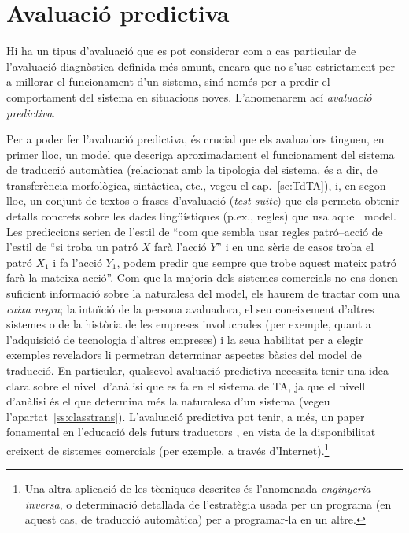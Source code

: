 \section{Avaluació predictiva}
\label{ss:avalpred}

Hi ha un tipus d'avaluació que es pot considerar com a cas particular
de l'avaluació diagnòstica definida més amunt, encara que no s'use
estrictament per a millorar el funcionament d'un sistema, sinó només
per a predir el comportament del sistema en situacions noves.
L'anomenarem ací \emph{avaluació predictiva}.

Per a poder fer l'avaluació predictiva, és crucial que els avaluadors
tinguen, en primer lloc, un model que descriga aproximadament el
funcionament del sistema de traducció automàtica (relacionat amb la
tipologia del sistema, és a dir, de transferència morfològica,
sintàctica, etc., vegeu el cap.~\ref{se:TdTA}), i, en segon lloc, un
conjunt de textos o frases d'avaluació (\emph{test suite}) que els
permeta obtenir detalls concrets sobre les dades lingüístiques (p.ex.,
regles) que usa aquell model.  Les prediccions serien de l'estil de
``com que sembla usar regles patró--acció de l'estil de ``si troba un
patró $X$ farà l'acció $Y$'' i en una sèrie de casos troba el patró
$X_1$ i fa l'acció $Y_1$, podem predir que sempre que trobe aquest
mateix patró farà la mateixa acció''. Com que la majoria dels sistemes
comercials no ens donen suficient informació sobre la naturalesa del
model, els haurem de tractar com una \emph{caixa negra}; la
intuïció de la persona avaluadora, el seu coneixement d'altres
sistemes o de la història de les empreses involucrades (per exemple,
quant a l'adquisició de tecnologia d'altres empreses) i la seua
habilitat per a elegir exemples reveladors li permetran determinar
aspectes bàsics del model de traducció. En particular, qualsevol
avaluació predictiva necessita tenir una idea clara sobre el nivell
d'anàlisi que es fa en el sistema de TA, ja que el nivell d'anàlisi és
el que determina més la naturalesa d'un sistema (vegeu
l'apartat~\ref{ss:classtrans}).  L'avaluació predictiva pot tenir, a
més, un paper fonamental en l'educació dels futurs traductors
\citep{mira98j,forcada00p}, en vista de la disponibilitat creixent de
sistemes comercials (per exemple, a través d'Internet).\footnote{Una
  altra aplicació de les tècniques descrites és l'anomenada
  \emph{enginyeria inversa}, o determinació detallada de l'estratègia
  usada per un programa (en aquest cas, de traducció automàtica) per a
  programar-la en un altre.}

